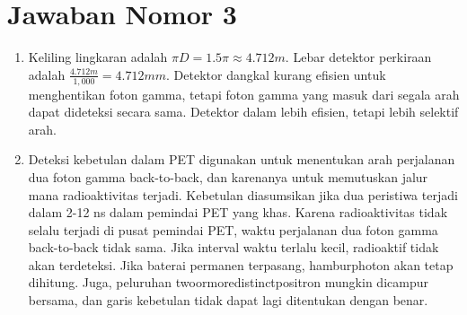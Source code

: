 \section{Jawaban Nomor 3}
\begin{enumerate}
\item Keliling lingkaran adalah $\pi D = 1.5\pi \approx 4.712 m.$
\subitem Lebar detektor perkiraan adalah $\frac{4.712 m}{1,000} = 4.712 mm.$
Detektor dangkal kurang efisien untuk menghentikan foton gamma, tetapi foton gamma yang masuk dari segala arah dapat dideteksi secara sama. Detektor dalam lebih efisien, tetapi lebih selektif arah.
\item Deteksi kebetulan dalam PET digunakan untuk menentukan arah perjalanan dua foton gamma back-to-back, dan karenanya untuk memutuskan jalur mana radioaktivitas terjadi. Kebetulan diasumsikan jika dua peristiwa terjadi dalam 2-12 ns dalam pemindai PET yang khas. Karena radioaktivitas tidak selalu terjadi di pusat pemindai PET, waktu perjalanan dua foton gamma back-to-back tidak sama.  Jika interval waktu terlalu kecil, radioaktif tidak akan terdeteksi. Jika baterai permanen terpasang, hamburphoton akan tetap dihitung. Juga, peluruhan twoormoredistinctpositron mungkin dicampur bersama, dan garis kebetulan tidak dapat lagi ditentukan dengan benar.
\end{enumerate}